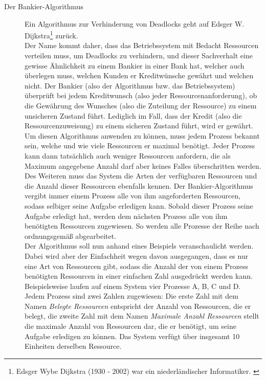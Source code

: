 \begin{description}
\begin{description}
							\item[Der Bankier-Algorithmus]
							
								Ein Algorithmus zur Verhinderung von Deadlocks geht auf Edsger W. Dijkstra\footnote{Edsger Wybe Dijkstra (1930 - 2002) war ein niederländischer Informatiker. \cite{DijkstraWikipedia}} zurück.\\
								Der Name kommt daher, dass das Betriebssystem mit Bedacht Ressourcen verteilen muss, um Deadlocks zu verhindern, und dieser Sachverhalt eine gewisse Ähnlichkeit zu einem Bankier in einer Bank hat, welcher auch überlegen muss, welchen Kunden er Kreditwünsche gewährt und welchen nicht. Der Bankier (also der Algorithmus bzw. das Betriebssystem) überprüft bei jedem Kreditwunsch (also jeder Ressourcenanforderung), ob die Gewährung des Wunsches (also die Zuteilung der Ressource) zu einem unsicheren Zustand führt. Lediglich im Fall, dass der Kredit (also die Ressourcenzuweisung) zu einem sicheren Zustand führt, wird er gewährt. \cite{BankieralgorithmusWikipedia}\\
								Um diesen Algorithmus anwenden zu können, muss jedem Prozess bekannt sein, welche und wie viele Ressourcen er maximal benötigt. Jeder Prozess kann dann tatsächlich auch weniger Ressourcen anfordern, die als Maximum angegebene Anzahl darf aber keines Falles überschritten werden. Des Weiteren muss das System die Arten der verfügbaren Ressourcen und die Anzahl dieser Ressourcen ebenfalls kennen. Der Bankier-Algorithmus vergibt immer einem Prozess alle von ihm angeforderten Ressourcen, sodass selbiger seine Aufgabe erledigen kann. Sobald dieser Prozess seine Aufgabe erledigt hat, werden dem nächsten Prozess alle von ihm benötigten Ressourcen zugewiesen. So werden alle Prozesse der Reihe nach ordnungsgemäß abgearbeitet.\\
								Der Algorithmus soll nun anhand eines Beispiels veranschaulicht werden. Dabei wird aber der Einfachheit wegen davon ausgegangen, dass es nur eine Art von Ressourcen gibt, sodass die Anzahl der von einem Prozess benötigten Ressourcen in einer einfachen Zahl ausgedrückt werden kann.\\
								Beispielsweise laufen auf einem System vier Prozesse A, B, C und D. Jedem Prozess sind zwei Zahlen zugewiesen: Die erste Zahl mit dem Namen \textit{Belegte Ressourcen} entspricht der Anzahl von Ressourcen, die er belegt, die zweite Zahl mit dem Namen \textit{Maximale Anzahl Ressourcen} stellt die maximale Anzahl von Ressourcen dar, die er benötigt, um seine Aufgabe erledigen zu können. Das System verfügt über insgesamt 10 Einheiten derselben Ressource.\\

\end{description}
\end{description}
